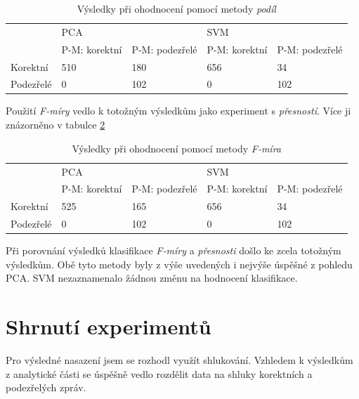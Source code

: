 \documentclass[thesis=M,czech]{FITthesis}[2012/10/20]
\begin{document}
			\begin{table}[htb]\centering
				\centering
				\caption{Výsledky při ohodnocení pomocí metody \textit{podíl}}
				\label{table:anomaly_recall}
				\begin{tabular}{|l|l|l|l|l|}
					\hline
					\multirow{2}{*}{} & \multicolumn{2}{l|}{PCA}                 & \multicolumn{2}{l|}{SVM}                 \\ 
					& P-M: korektní & P-M: podezřelé & P-M: korektní & P-M: podezřelé \\ \hline
					Korektní          & 510                & 180                 & 656                & 34                  \\ \hline
					Podezřelé         & 0                  & 102                 & 0                  & 102                 \\ \hline
				\end{tabular}
			\end{table}
		
			Použití \textit{F-míry} vedlo k totožným výsledkům jako experiment s \textit{přesností}. Více ji znázorněno v tabulce \ref{table:anomaly_f-score}
		
			\begin{table}[htb]\centering
				\centering
				\caption{Výsledky při ohodnocení pomocí metody \textit{F-míra}}
				\label{table:anomaly_f-score}
				\begin{tabular}{|l|l|l|l|l|}
					\hline
					\multirow{2}{*}{} & \multicolumn{2}{l|}{PCA}                 & \multicolumn{2}{l|}{SVM}                 \\ 
					& P-M: korektní & P-M: podezřelé & P-M: korektní & P-M: podezřelé \\ \hline
					Korektní          & 525                & 165                 & 656                & 34                  \\ \hline
					Podezřelé         & 0                  & 102                 & 0                  & 102                 \\ \hline
				\end{tabular}
			\end{table}
		
			Při porovnání výsledků klasifikace \textit{F-míry} a \textit{přesnosti} došlo ke zcela totožným výsledkům. Obě tyto metody byly z výše uvedených i nejvýše úspěšné z pohledu PCA. SVM nezaznamenalo žádnou změnu na hodnocení klasifikace.
		
			
	
		\section{Shrnutí experimentů}
			Pro výsledné nasazení jsem se rozhodl využít shlukování. Vzhledem k výsledkům z analytické části se úspěšně vedlo rozdělit data na shluky korektních a podezřelých zpráv.
			
\end{document}
